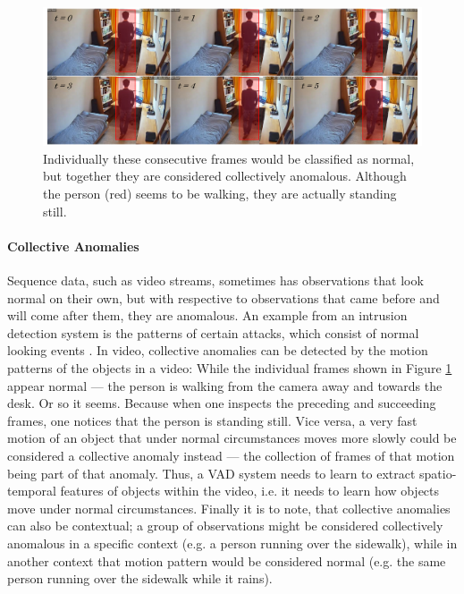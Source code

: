 \begin{figure}
	\centering
	\includegraphics[width=1\textwidth]{graphics/anomalyDetection/anomalies/collectiveAnomaly/collectiveAnomaly.pdf}
  \caption[Collective anomaly in video.]{Individually these consecutive frames would be classified as normal, but together they are considered collectively anomalous. Although the person (red) seems to be walking, they are actually standing still.}
  \label{fig:collective_vid_anomaly}
\end{figure}

\paragraph{Collective Anomalies} \label{par:collect_ano}
Sequence data, such as video streams, sometimes has observations that look normal on their own, but with respective to observations that came before and will come after them, they are anomalous. An example from an intrusion detection system is the patterns of certain attacks, which consist of normal looking events \cite{chandola2009anomaly}. In video, collective anomalies can be detected by the motion patterns of the objects in a video: While the individual frames shown in Figure \ref{fig:collective_vid_anomaly} appear normal --- the person is walking from the camera away and towards the desk. Or so it seems. Because when one inspects the preceding and succeeding frames, one notices that the person is standing still. Vice versa, a very fast motion of an object that under normal circumstances moves more slowly could be considered a collective anomaly instead --- the collection of frames of that motion being part of that anomaly. Thus, a VAD system needs to learn to extract spatio-temporal features of objects within the video, i.e. it needs to learn how objects move under normal circumstances. Finally it is to note, that collective anomalies can also be contextual; a group of observations might be considered collectively anomalous in a specific context (e.g. a person running over the sidewalk), while in another context that motion pattern would be considered normal (e.g. the same person running over the sidewalk while it rains).


